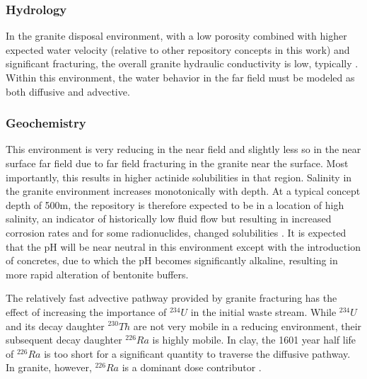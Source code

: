 

\subsubsection{Hydrology}

In the granite disposal environment, with a low porosity combined with 
higher expected water velocity (relative to other repository concepts in this 
work) and significant fracturing, the overall 
granite hydraulic conductivity is low, typically
\cite{schwartz_fundamentals_2004, 
hardin_generic_2011}. Within this environment, the  
water behavior in the far field must be modeled as both diffusive and advective.

\subsubsection{Geochemistry}

This environment is very reducing in the near field and slightly less so in the 
near surface far field due to far field fracturing in the granite near the 
surface. Most importantly, this results in higher actinide solubilities in that 
region. Salinity in the granite environment increases monotonically with depth. 
At a typical concept depth of 500m, the repository is therefore expected to be 
in a location of high salinity, an indicator of historically low fluid flow but 
resulting in increased corrosion rates and for some radionuclides, changed 
solubilities \cite{andra_granite:_2005}.  It is expected that the pH will be 
near neutral in this environment except with  the introduction of concretes, 
due to which the pH becomes significantly alkaline, resulting in more rapid 
alteration of bentonite buffers. 

The relatively fast advective pathway provided by granite fracturing
has the effect of increasing the importance of $^{234}U$ in the initial waste 
stream. While $^{234}U$ and its decay daughter $^{230}Th$ are not very mobile 
in a reducing environment, their subsequent decay daughter $^{226}Ra$ is highly 
mobile. In clay, the 1601 year half life of $^{226}Ra$ is too short for a 
significant quantity to traverse the diffusive pathway. In granite, however,  
$^{226}Ra$ is a dominant dose contributor \cite{swift_applying_2010}. 

